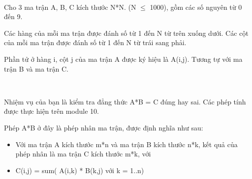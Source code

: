  

Cho 3 ma trận A, B, C kích thước N*N. (N  $\le$  1000), gồm các số nguyên từ 0 đến 9.

Các hàng của mỗi ma trận được đánh số từ 1 đến N từ trên xuống dưới. Các cột của mỗi ma trận được đánh số từ 1 đến N từ trái sang phải.

Phần tử ở hàng i, cột j của ma trận A được ký hiệu là A(i,j). Tương tự với ma trận B và ma trận C.

 

Nhiệm vụ của bạn là kiểm tra đẳng thức A*B = C đúng hay sai. Các phép tính được thực hiện trên module 10.

Phép A*B ở đây là phép nhân ma trận, được định nghĩa như sau:
\begin{itemize}
	\item Với ma trận A kích thước m*n và ma trận B kích thước n*k, kết quả của phép nhân là ma trận C kích thước m*k, với
	\item C(i,j) = sum( A(i,k) * B(k,j) với k = 1..n)
\end{itemize}